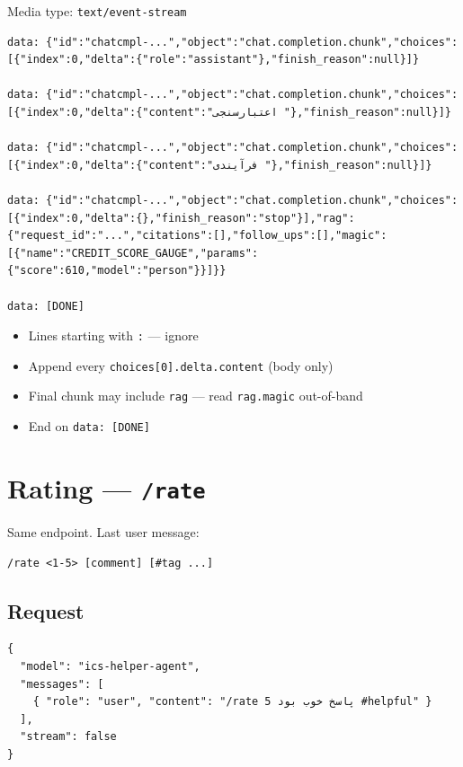\documentclass[11pt,a4paper]{article}
\begin{document}
\noindent Media type: \texttt{text/event-stream}

\begin{lstlisting}
data: {"id":"chatcmpl-...","object":"chat.completion.chunk","choices":[{"index":0,"delta":{"role":"assistant"},"finish_reason":null}]}

data: {"id":"chatcmpl-...","object":"chat.completion.chunk","choices":[{"index":0,"delta":{"content":"اعتبارسنجی "},"finish_reason":null}]}

data: {"id":"chatcmpl-...","object":"chat.completion.chunk","choices":[{"index":0,"delta":{"content":"فرآیندی "},"finish_reason":null}]}

data: {"id":"chatcmpl-...","object":"chat.completion.chunk","choices":[{"index":0,"delta":{},"finish_reason":"stop"}],"rag":{"request_id":"...","citations":[],"follow_ups":[],"magic":[{"name":"CREDIT_SCORE_GAUGE","params":{"score":610,"model":"person"}}]}}

data: [DONE]
\end{lstlisting}

\begin{itemize}
  \item Lines starting with \texttt{:} --- ignore
  \item Append every \texttt{choices[0].delta.content} (body only)
  \item Final chunk may include \texttt{rag} --- read \texttt{rag.magic} out-of-band
  \item End on \texttt{data: [DONE]}
\end{itemize}

\section{Rating --- \texttt{/rate}}

\noindent Same endpoint. Last user message:

\begin{lstlisting}
/rate <1-5> [comment] [#tag ...]
\end{lstlisting}

\subsection{Request}

\begin{lstlisting}
{
  "model": "ics-helper-agent",
  "messages": [
    { "role": "user", "content": "/rate 5 پاسخ خوب بود #helpful" }
  ],
  "stream": false
}
\end{lstlisting}
\end{document}
